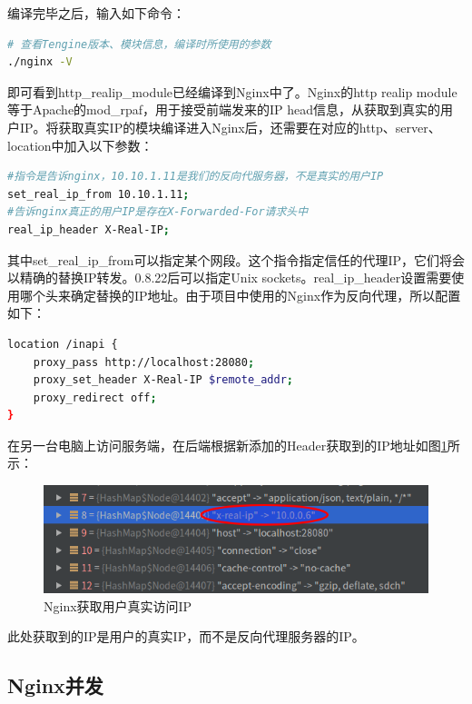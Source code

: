 \documentclass[letter]{book}
\begin{document}
编译完毕之后，输入如下命令：

\begin{lstlisting}[language=bash]
# 查看Tengine版本、模块信息，编译时所使用的参数
./nginx -V
\end{lstlisting}

即可看到http\_realip\_module已经编译到Nginx中了。Nginx的http realip module等于Apache的mod\_rpaf，用于接受前端发来的IP head信息，从获取到真实的用户IP。将获取真实IP的模块编译进入Nginx后，还需要在对应的http、server、location中加入以下参数：

\begin{lstlisting}[language=bash]
#指令是告诉nginx，10.10.1.11是我们的反向代服务器，不是真实的用户IP
set_real_ip_from 10.10.1.11;
#告诉nginx真正的用户IP是存在X-Forwarded-For请求头中
real_ip_header X-Real-IP;
\end{lstlisting}

其中set\_real\_ip\_from可以指定某个网段。这个指令指定信任的代理IP，它们将会以精确的替换IP转发。0.8.22后可以指定Unix sockets。real\_ip\_header设置需要使用哪个头来确定替换的IP地址。由于项目中使用的Nginx作为反向代理，所以配置如下：

\begin{lstlisting}[language=bash]
location /inapi {
	proxy_pass http://localhost:28080;
	proxy_set_header X-Real-IP $remote_addr;
	proxy_redirect off;
}
\end{lstlisting}

在另一台电脑上访问服务端，在后端根据新添加的Header获取到的IP地址如图\ref{fig:nginxgetrealip}所示：

\begin{figure}[htbp]
	\centering
	\includegraphics[scale=0.6]{nginxgetrealip.png}
	\caption{Nginx获取用户真实访问IP}
	\label{fig:nginxgetrealip}
\end{figure}

此处获取到的IP是用户的真实IP，而不是反向代理服务器的IP。

\subsection{Nginx并发}
\end{document}
